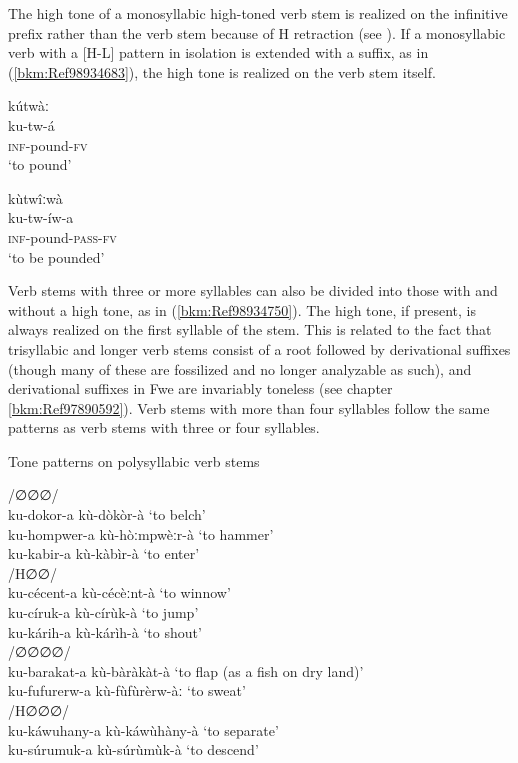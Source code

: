 The high tone of a monosyllabic high-toned verb stem is realized on the infinitive prefix rather than the verb stem because of H retraction (see ). If a monosyllabic verb with a [H-L] pattern in isolation is extended with a suffix, as in (\ref{bkm:Ref98934683}), the high tone is realized on the verb stem itself.

\ea
\label{bkm:Ref98934683}
\glll kútwàː\\
ku-tw-á\\
\textsc{inf}-pound-\textsc{fv}\\
\glt ‘to pound’
\z

\ea
\glll kùtwîːwà\\
ku-tw-íw-a\\
\textsc{inf}-pound-\textsc{pass}-\textsc{fv}\\
\glt ‘to be pounded’
\z

Verb stems with three or more syllables can also be divided into those with and without a high tone, as in (\ref{bkm:Ref98934750}). The high tone, if present, is always real\-ized on the first syllable of the stem. This is related to the fact that trisyllabic and longer verb stems consist of a root followed by derivational suffixes (though many of these are fossilized and no longer analyzable as such), and derivational suffixes in Fwe are invariably toneless (see chapter \ref{bkm:Ref97890592}). Verb stems with more than four syllables follow the same patterns as verb stems with three or four syllables.

\ea
{}
\label{bkm:Ref98934750}
  Tone patterns on polysyllabic verb stems

\ea
/∅∅∅/ \tab [LLL]\\
ku-dokor-a \tab kù-dòkòr-à \tab ‘to belch’\\
ku-hompwer-a \tab kù-hòːmpwèːr-à \tab ‘to hammer’\\
ku-kabir-a \tab kù-kàbìr-à \tab ‘to enter’\\
\ex /H∅∅/ \tab [HLL] \tab \\
ku-cécent-a \tab kù-cécèːnt-à \tab ‘to winnow’\\
ku-círuk-a \tab kù-círùk-à \tab ‘to jump’\\
ku-kárih-a \tab kù-kárìh-à \tab ‘to shout’\\
\ex /∅∅∅∅/ \tab [LLLL] \tab \\
ku-barakat-a \tab kù-bàràkàt-à \tab ‘to flap (as a fish on dry land)’\\
ku-fufurerw-a \tab kù-fùfùrèrw-àː \tab ‘to sweat’\\
/H∅∅∅/ \tab [HLLL] \tab \\
ku-káwuhany-a \tab kù-káwùhàny-à \tab ‘to separate’\\
ku-súrumuk-a \tab kù-súrùmùk-à \tab ‘to descend’\\
\z\z

